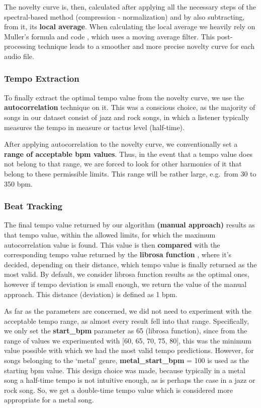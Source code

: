 \documentclass[
  letterpaper,
  twocolumn]{article}
\begin{document}
The novelty curve is, then, calculated after applying all the necessary
steps of the spectral-based method (compression - normalization) and by
also subtracting, from it, its \textbf{local average}. When calculating
the local average we heavily rely on Muller's formula and code
\autocite{mullerSpectralBasedNovelty}, which uses a moving average
filter. This post-processing technique leads to a smoother and more
precise novelty curve for each audio file.

\subsubsection{Tempo Extraction}\label{tempo-extraction}

To finally extract the optimal tempo value from the novelty curve, we
use the \textbf{autocorrelation} technique on it. This was a conscious
choice, as the majority of songs in our dataset consist of jazz and rock
songs, in which a listener typically measures the tempo in measure or
tactus level (half-time).

After applying autocorrelation to the novelty curve, we conventionally
set a \textbf{range of acceptable bpm values}. Thus, in the event that a
tempo value does not belong to that range, we are forced to look for
other harmonics of it that belong to these permissible limits. This
range will be rather large, e.g.~from 30 to 350 bpm.

\subsubsection{Beat Tracking}\label{beat-tracking}

The final tempo value returned by our algorithm \textbf{(manual
approach)} results as that tempo value, within the allowed limits, for
which the maximum autocorrelation value is found. This value is then
\textbf{compared} with the corresponding tempo value returned by the
\textbf{librosa function} , where it's decided, depending on their
distance, which tempo value is finally returned as the most valid. By
default, we consider librosa function results as the optimal ones,
however if tempo deviation is small enough, we return the value of the
manual approach. This distance (deviation) is defined as 1 bpm.

As far as the parameters are concerned, we did not need to experiment
with the acceptable tempo range, as almost every result fell into that
range. Specifically, we only set the \textbf{start\_bpm} parameter as 65
(librosa function), since from the range of values
\hspace{0pt}\hspace{0pt}we experimented with {[}60, 65, 70, 75, 80{]},
this was the minimum value possible with which we had the most valid
tempo predictions. However, for songs belonging to the `metal' genre,
\textbf{metal\_start\_bpm} = 100 is used as the starting bpm value. This
design choice was made, because typically in a metal song a half-time
tempo is not intuitive enough, as is perhaps the case in a jazz or rock
song. So, we get a double-time tempo value which is considered more
appropriate for a metal song.
\end{document}

